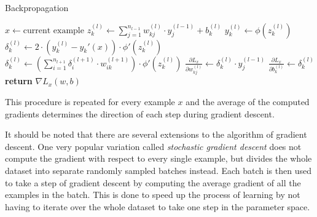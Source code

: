 \begin{algorithm}
  \caption{Backpropagation}
  \label{algo:backpropagation}
  \begin{algorithmic}[1]
    \State \(x\gets \text{current example}\)
        \State \(z_k^{(l)}\gets \sum_{j=1}^{n_{l-1}}{w_{kj}^{(l)} \cdot
          y_j^{(l-1)}} + b_k^{(l)}\)
        \State \(y_k^{(l)}\gets \phi(z_k^{(l)})\)
      \EndFor
    \EndFor
          \State \(\delta_k^{(l)}\gets 2 \cdot (y_k^{(l)}-y_k'(x)) \cdot
          \phi'(z_k^{(l)})\)
        \Else
          \State \(\delta_k^{(l)}\gets  \left(\sum_{i=1}^{n_{l+1}}{\delta_i^{(l+1)} \cdot w_{ik}^{(l+1)}}\right)
            \cdot \phi'(z_k^{(l)})\)
        \EndIf
          \State \(\frac{\partial L_x}{\partial w_{kj}^{(l)}}\gets
          \delta_k^{(l)} \cdot y_j^{(l-1)}\)
        \EndFor
        \State \(\frac{\partial L_x}{\partial b_{k}^{(l)}}\gets
          \delta_k^{(l)}\)  
      \EndFor
    \EndFor
    \State\textbf{return }\(\nabla L_x(w, b)\)
  \end{algorithmic}
\end{algorithm}

This procedure is repeated for every example \(x\) and the average of
the computed gradients determines the direction of each step during
gradient descent.

It should be noted that there are several extensions to the algorithm
of gradient descent. One very popular variation called
\textit{stochastic gradient descent} \cite{Bottou} does not compute the
gradient with respect to every single example, but divides the whole
dataset into separate randomly sampled batches instead. Each batch is
then used to take a step of gradient descent by
computing the average gradient of all the examples in the batch.
This is done to speed up the process of learning by not
having to iterate over the whole dataset to take one step in the
parameter space.

